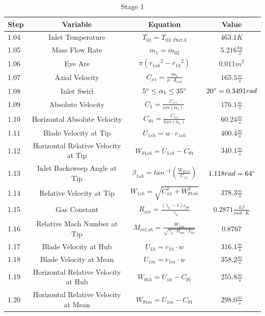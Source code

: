\documentclass[12pt, letter]{report}
\begin{document}
\begin{table}
    \centering
    \caption{Stage 1  \cite{lectureslides}}
    \begin{tabular}{|l|c|c|c|} \hline 
          \textbf{Step} &\textbf{Variable}&  \textbf{Equation}& \textbf{Value}\\ \hline 
1.04&  Inlet Temperature&  $T_{01}=T_{03:Part A}$& $463.1K$\\ \hline 
1.05&  Mass Flow Rate&  $\dot m_1= \dot m_{02}$& $5.216 \frac{kg}{s}$\\ \hline 
1.06&  Eye Are&  $\pi ({r_{1sh}}^2 - {r_{1h}}^2)$& $0.011m^2$\\ \hline 
1.07&  Axial Velocity&  $C_{x1}=\frac{\dot m_1}{\rho \cdot A_{1sh}}$& $165.5 \frac{m}{s}$\\ \hline 
1.08&  Inlet Swirl&  $5\degree \leq \alpha_1 \leq 35\degree$ & $20 \degree = 0.3491 rad$\\ \hline 
1.09& Absolute Velocity& $C_1=\frac{C_{x1}}{cos(\alpha_1)}$& $176.1 \frac{m}{s}$\\ \hline 
1.10& Horizontal Absolute Velocity& $C_{\theta1}=\frac{C_{x1}}{tan(\alpha_1)}$& $60.24 \frac{m}{s}$\\ \hline 
1.11& Blade Velocity at Tip& $U_{1sh}=w \cdot r_{1sh}$& $400.4 \frac{m}{s}$\\ \hline 
1.12& Horizontal Relative Velocity at Tip& $W_{\theta1sh}=U_{1sh}-C_{\theta1}$& $340.1 \frac{m}{s}$\\ \hline 
1.13& Inlet Backsweep Angle at Tip& $\beta_{1sh}=tan^{-1}(\frac{W_{\theta1sh}}{C_{x1}})$& $1.118 rad = 64 \degree$\\ \hline 
1.14& Relative Velocity at Tip& $W_{1sh}=\sqrt{C_{x1}^2+W_{\theta1sh}^2}$& $378.3 \frac{m}{s}$\\ \hline 
1.15& Gas Constant& $R_{air}=\frac{(\gamma_a-1)c_{pa}}{\gamma_a}$& $0.2871 \frac{kJ}{mol \cdot K}$\\ \hline 
1.16& Relative Mach Number at Tip& $M_{rel.sh}=\frac{W_{1sh}}{\sqrt{\gamma_a \cdot R_{air} \cdot T_{01}}}$& $0.8767$\\ \hline 
1.17& Blade Velocity at Hub& $U_{1h}=r_{1h} \cdot w$& $316.1 \frac{m}{s}$\\ \hline 
1.18& Blade Velocity at Mean& $U_{1m}=r_{1m} \cdot w$& $358.2 \frac{m}{s}$\\ \hline 
1.19& Horizontal Relative Velocity at Hub& $W_{\theta1h}=U_{1h}-C_{\theta1}$& $255.8 \frac{m}{s}$\\ \hline 
1.20& Horizontal Relative Velocity at Mean& $W_{\theta1m}=U_{1m}-C_{\theta1}$& $298.0 \frac{m}{s}$\\ \hline 

\end{tabular}
\end{table}
\end{document}
